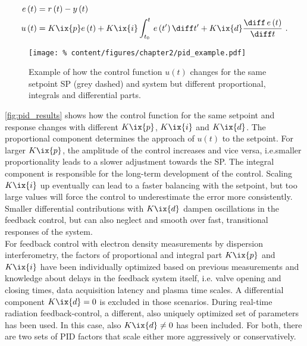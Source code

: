 %
                \begin{align}%
                    \begin{split}%
                        e\left(t\right)&=r\left(t\right)-y\left(t\right)\\%
                        u\left(t\right)&=K\ix{p}e\left(t\right)+K\ix{i}\int_{t_{0}}^{t}\,e\left(t^{\prime}\right)\diff t^{\prime}+K\ix{d}\frac{\diff\,e\left(t\right)}{\diff t}\,\,.%
                    \end{split}\label{eq:pid}%
                \end{align}%
%
                \begin{figure}[t]%
                    \centering%
                    \texttt{[image: \%
                        content/figures/chapter2/pid\_example.pdf]}%
                    \caption{Example of how the control function $u\left(t\right)$ changes for the same setpoint SP (grey dashed) and system but different proportional, integrals and differential parts.}\label{fig:pid_results}%
                \end{figure}%
%
                \autoref{fig:pid_results} shows how the control function for the same setpoint and response changes with different $K\ix{p}$, $K\ix{i}$ and $K\ix{d}$. The proportional component determines the approach of $u\left(t\right)$ to the setpoint. For larger $K\ix{p}$, the amplitude of the control increases and vice versa, i.e.smaller proportionality leads to a slower adjustment towards the SP. The integral component is responsible for the long-term development of the control. Scaling $K\ix{i}$ up eventually can lead to a faster balancing with the setpoint, but too large values will force the control to underestimate the error more consistently. Smaller differential contributions with $K\ix{d}$ dampen oscillations in the feedback control, but can also neglect and smooth over fast, transitional responses of the system.\\%
                For feedback control with electron density measurements by dispersion interferometry, the factors of proportional and integral part $K\ix{p}$ and $K\ix{i}$ have been individually optimized based on previous measurements and knowledge about delays in the feedback system itself, i.e. valve opening and closing times, data acquisition latency and plasma time scales. A differential component $K\ix{d}=0$ is excluded in those scenarios. During real-time radiation feedback-control, a different, also uniquely optimized set of parameters has been used. In this case, also $K\ix{d}\neq 0$ has been included. For both, there are two sets of PID factors that scale either more aggressively or conservatively.%
%
